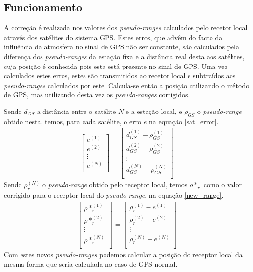 \documentclass{article}
\begin{document}
\subsection{Funcionamento}

A correção é realizada nos valores dos \textit{pseudo-ranges}
calculados pelo recetor local através dos satélites do sistema GPS.
Estes erros, que advêm do facto da influência da atmosfera no sinal
de GPS não ser constante, são calculados pela diferença dos
\textit{pseudo-ranges} da estação fixa e a distância real desta aos
satélites, cuja posição é conhecida pois esta está presente no sinal
de GPS. Uma vez calculados estes erros, estes são transmitidos ao
recetor local e subtraídos aos \textit{pseudo-ranges} calculados por
este. Calcula-se então a posição utilizando o método de GPS, mas
utilizando desta vez os \textit{pseudo-ranges} corrigidos.

Sendo $d_{GS}$ a distância entre o satélite $N$ e a
estação local, e $\rho_{GS}$ o \textit{pseudo-range} obtido nesta, temos,
para cada satélite, o erro $e$ na equação \ref{sat_error}.
\begin{gather} \label{sat_error}
	\left[\begin{matrix}
		e^{(1)} \\
        e^{(2)} \\
        \vdots \\
        e^{(N)} \\
	\end{matrix}\right]
	= \left[\begin{matrix}
		d^{(1)}_{GS} - \rho^{(1)}_{GS} \\
        d^{(2)}_{GS} - \rho^{(2)}_{GS} \\
        \vdots \\
        d^{(N)}_{GS} - \rho^{(N)}_{GS} \\
	\end{matrix}\right]
\end{gather}
Sendo $\rho^{(N)}_{r}$ o \textit{pseudo-range} obtido pelo receptor local, temos $\rho*_r $ como o valor corrigido para o receptor local do \textit{pseudo-range}, na equação \ref{new_range}.
\begin{gather} \label{new_range}
	\left[\begin{matrix}
		\rho*^{(1)}_r \\
        \rho*^{(2)}_r \\
        \vdots \\
        \rho*^{(N)}_r \\
	\end{matrix}\right]
	= \left[\begin{matrix}
		\rho^{(1)}_{r} - e^{(1)} \\
        \rho^{(2)}_{r} - e^{(2)} \\
        \vdots \\
        \rho^{(N)}_{r} - e^{(N)} \\
	\end{matrix}\right]
\end{gather}
Com estes novos \textit{pseudo-ranges} podemos calcular a posição do receptor local da mesma forma que seria calculada no caso de GPS normal.
\end{document}
